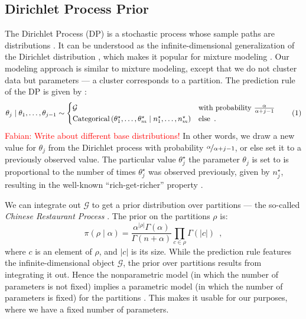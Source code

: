 \documentclass[11pt,a4paper]{article}
\theoremstyle{definition} %
\theoremstyle{case}
\newcommand{\numberthis}{\addtocounter{equation}{1}\tag{\theequation}}
\newcommand{\FD}[1]{\textcolor{red}{Fabian: #1 }}
\begin{document}
\subsection{Dirichlet Process Prior}
The Dirichlet Process (DP) is a stochastic process whose sample paths are distributions \parencite{ferguson1973bayesian}. It can be understood as the infinite-dimensional generalization of the Dirichlet distribution \parencite[e.g.,][]{teh2010dirichlet}, which makes it popular for mixture modeling \parencite{rasmussen1999infinite}. Our modeling approach is similar to mixture modeling, except that we do not cluster data but parameters --- a cluster corresponds to a partition. The prediction rule of the DP is given by \parencite[e.g.,][]{ishwaran2001gibbs, blackwell1973ferguson}:
\begin{equation}
    \theta_j \mid \theta_1, \ldots, \theta_{j - 1} \sim \begin{cases}
    \mathcal{G} & \text{with probability } \frac{\alpha}{\alpha + j - 1} \\
    \text{Categorical}\left(\theta_1^{\star}, \ldots, \theta_m^{\star} \mid n^{\star}_1, \ldots, n^{\star}_m\right) & \text{else} \enspace .
    \end{cases} \numberthis
\end{equation}
\FD{Write about different base distributions!}
In other words, we draw a new value for $\theta_j$ from the Dirichlet process with probability $\nicefrac{\alpha}{\alpha + j - 1}$, or else set it to a previously observed value. The particular value $\theta^{\star}_j$ the parameter $\theta_j$ is set to is proportional to the number of times $\theta^{\star}_j$ was observed previously, given by $n^{\star}_j$, resulting in the well-known ``rich-get-richer'' property \parencite[e.g.,][]{teh2010dirichlet}.

We can integrate out $\mathcal{G}$ to get a prior distribution over partitions --- the so-called \textit{Chinese Restaurant Process} \parencite[e.g.,][]{teh2010dirichlet}. The prior on the partitions $\rho$ is:
\begin{equation}
    \pi(\rho \mid \alpha) = \frac{\alpha^{|\rho|}\Gamma(\alpha)}{\Gamma(n + \alpha)} \prod_{c \in \rho} \Gamma(|c|) \enspace ,
\end{equation}
where $c$ is an element of $\rho$, and $|c|$ is its size. While the prediction rule features the infinite-dimensional object $\mathcal{G}$, the prior over partitions results from integrating it out. Hence the nonparametric model (in which the number of parameters is not fixed) implies a parametric model (in which the number of parameters is fixed) for the partitions \parencite{quintana2006predictive}. This makes it usable for our purposes, where we have a fixed number of parameters.
\end{document}
